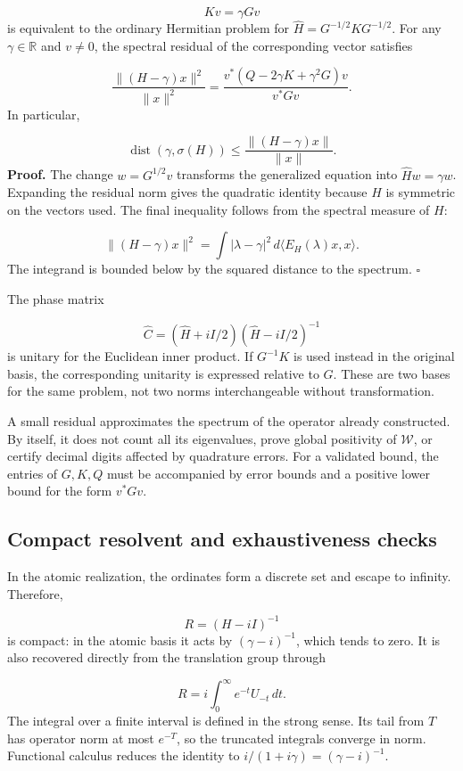 \[
Kv=\gamma Gv
\]
is equivalent to the ordinary Hermitian problem for \(\widehat H=G^{-1/2}KG^{-1/2}\). For any \(\gamma\in\mathbb R\) and \(v\neq0\), the spectral residual of the corresponding vector satisfies

\[
\frac{\|(H-\gamma)x\|^2}{\|x\|^2}
=\frac{v^*(Q-2\gamma K+\gamma^2G)v}{v^*Gv}.
\]
In particular,

\[
\operatorname{dist}(\gamma,\sigma(H))
\leq\frac{\|(H-\gamma)x\|}{\|x\|}.
\]
\textbf{Proof.} The change \(w=G^{1/2}v\) transforms the generalized equation into \(\widehat Hw=\gamma w\). Expanding the residual norm gives the quadratic identity because \(H\) is symmetric on the vectors used. The final inequality follows from the spectral measure of \(H\):

\[
\|(H-\gamma)x\|^2
=\int |\lambda-\gamma|^2\,d\langle E_H(\lambda)x,x\rangle.
\]
The integrand is bounded below by the squared distance to the spectrum. \hfill\(\square\)

The phase matrix

\[
\widehat C=(\widehat H+iI/2)(\widehat H-iI/2)^{-1}
\]
is unitary for the Euclidean inner product. If \(G^{-1}K\) is used instead in the original basis, the corresponding unitarity is expressed relative to \(G\). These are two bases for the same problem, not two norms interchangeable without transformation.

A small residual approximates the spectrum of the operator already constructed. By itself, it does not count all its eigenvalues, prove global positivity of \(\mathscr W\), or certify decimal digits affected by quadrature errors. For a validated bound, the entries of \(G,K,Q\) must be accompanied by error bounds and a positive lower bound for the form \(v^*Gv\).

\subsection{Compact resolvent and exhaustiveness checks}
\label{rz:resolvente}
In the atomic realization, the ordinates form a discrete set and escape to infinity. Therefore,

\[
R=(H-iI)^{-1}
\]
is compact: in the atomic basis it acts by \((\gamma-i)^{-1}\), which tends to zero. It is also recovered directly from the translation group through

\[
R=i\int_0^\infty e^{-t}U_{-t}\,dt.
\]
The integral over a finite interval is defined in the strong sense. Its tail from \(T\) has operator norm at most \(e^{-T}\), so the truncated integrals converge in norm. Functional calculus reduces the identity to \(i/(1+i\gamma)=(\gamma-i)^{-1}\).

